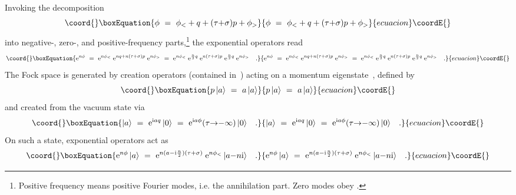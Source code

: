 \documentclass[a4paper,11pt]{article}
\def\s{\sigma}
\def\t{\tau}
\def\e{\textrm{e}}
\def\i{\textrm{i}}
\begin{document}
Invoking the decomposition
\begin{equation}\coord{}\boxEquation{
\phi\ =\ \phi_< + q + (\t{+}\s)p + \phi_> 
}{
\phi\ =\ \phi_< + q + (\t{+}\s)p + \phi_> 
}{ecuacion}\coordE{}\end{equation}
into negative-, zero-, and positive-frequency parts,\footnote{
Positive frequency means positive Fourier modes, i.e. the annihilation part.
Zero modes obey \myHighlight{$[q,p]=\i$}\coordHE{}.}
the exponential operators read
\begin{equation}\coord{}\boxEquation{
\e^{n\phi}\ =\ \e^{n\phi_<}\;\e^{nq+n(\t{+}\s)p}\;\e^{n\phi_>}\ =\
\e^{n\phi_<}\;\e^{\frac{n}{2}q}\;\e^{n(\t{+}\s)p}\;\e^{\frac{n}{2}q}\;
\e^{n\phi_>} \quad.
}{
\e^{n\phi}\ =\ \e^{n\phi_<}\;\e^{nq+n(\t{+}\s)p}\;\e^{n\phi_>}\ =\
\e^{n\phi_<}\;\e^{\frac{n}{2}q}\;\e^{n(\t{+}\s)p}\;\e^{\frac{n}{2}q}\;
\e^{n\phi_>} \quad.
}{ecuacion}\coordE{}\end{equation}
The \myHighlight{$\phi$}\coordHE{} Fock space is generated by \myHighlight{$\phi$}\coordHE{} creation operators 
(contained in~\myHighlight{$\phi_<$}\coordHE{}) acting on a momentum eigenstate~\coordHE{}, defined by
\begin{equation}\coord{}\boxEquation{
p\,|a\rangle\ =\ a\,|a\rangle 
}{
p\,|a\rangle\ =\ a\,|a\rangle 
}{ecuacion}\coordE{}\end{equation}
and created from the vacuum state via
\begin{equation}\coord{}\boxEquation{
|a\rangle\ =\ \e^{\i a q}\,|0\rangle\ =\ 
\e^{\i a\phi}(\t{\to}{-}\infty)\,|0\rangle \quad.
}{
|a\rangle\ =\ \e^{\i a q}\,|0\rangle\ =\ 
\e^{\i a\phi}(\t{\to}{-}\infty)\,|0\rangle \quad.
}{ecuacion}\coordE{}\end{equation}
On such a state, exponential operators act as
\begin{equation}\coord{}\boxEquation{
\e^{n\phi}\,|a\rangle\ =\ 
\e^{n(a-\i\frac{n}{2})(\t+\s)}\;\e^{n\phi_<}\, |a{-}n\i\rangle \quad.
}{
\e^{n\phi}\,|a\rangle\ =\ 
\e^{n(a-\i\frac{n}{2})(\t+\s)}\;\e^{n\phi_<}\, |a{-}n\i\rangle \quad.
}{ecuacion}\coordE{}\end{equation}
\end{document}
